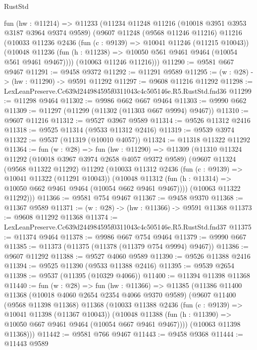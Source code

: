 \begin{lexlean}{RustStd}
\begin{coremodule}
  fun (hw : @11214) =>
  @11233
    (@11234
      @11248
      @11216
      (@10018 @3951 @3953 @3187 @3964 @9374 @9589)
      (@9607
        @11248
        (@9568 @11246 @11216)
        @11216
        (@10033
          @11236
          @2436
          (fun (c : @9139) => @10041 @11246 (@11215 @10043))
          (@10048 @11236 (fun (h : @11238) => @10050 @561 @9461 @9464 (@10054 @561 @9461 @9467))))
        (@10063 @11246 @11216)))
@11290 := @9581 @667 @9467
@11291 := @9458 @9372
@11292 := @11291 @9589
@11295 := (w : @28) -> (hw : @11290) -> @9591 @11292
@11297 := @9608 @11216 @11292
@11298 := LexLeanPreserve.Cc639d244984595f0311043c4c505146e.R5.RustStd.fnd36
@11299 := @11298 @9464
@11302 := @9986 @662 @667 @9464
@11303 := @9990 @662
@11309 := @11297 (@11299 (@11302 (@11303 @667 @9994) @9467))
@11310 := @9607 @11216
@11312 := @9527 @3967 @9589
@11314 := @9526 @11312 @2416
@11318 := @9525 @11314 (@9533 @11312 @2416)
@11319 := @9539 @3974
@11322 := @9537 (@11319 (@10010 @4057))
@11324 := @11318 @11322 @11292
@11364 := fun (w : @28) =>
  fun (hw : @11290) =>
  @11309
    (@11310
      @11324
      @11292
      (@10018 @3967 @3974 @2658 @4057 @9372 @9589)
      (@9607
        @11324
        (@9568 @11322 @11292)
        @11292
        (@10033
          @11312
          @2436
          (fun (c : @9139) => @10041 @11322 (@11291 @10043))
          (@10048 @11312 (fun (h : @11314) => @10050 @662 @9461 @9464 (@10054 @662 @9461 @9467))))
        (@10063 @11322 @11292)))
@11366 := @9581 @754 @9467
@11367 := @9458 @9370
@11368 := @11367 @9589
@11371 := (w : @28) -> (hw : @11366) -> @9591 @11368
@11373 := @9608 @11292 @11368
@11374 := LexLeanPreserve.Cc639d244984595f0311043c4c505146e.R5.RustStd.fnd37
@11375 := @11374 @9464
@11378 := @9986 @667 @754 @9464
@11379 := @9990 @667
@11385 := @11373 (@11375 (@11378 (@11379 @754 @9994) @9467))
@11386 := @9607 @11292
@11388 := @9527 @4060 @9589
@11390 := @9526 @11388 @2416
@11394 := @9525 @11390 (@9533 @11388 @2416)
@11395 := @9539 @2654
@11398 := @9537 (@11395 (@10329 @4066))
@11400 := @11394 @11398 @11368
@11440 := fun (w : @28) =>
  fun (hw : @11366) =>
  @11385
    (@11386
      @11400
      @11368
      (@10018 @4060 @2654 @2354 @4066 @9370 @9589)
      (@9607
        @11400
        (@9568 @11398 @11368)
        @11368
        (@10033
          @11388
          @2436
          (fun (c : @9139) => @10041 @11398 (@11367 @10043))
          (@10048 @11388 (fun (h : @11390) => @10050 @667 @9461 @9464 (@10054 @667 @9461 @9467))))
        (@10063 @11398 @11368)))
@11442 := @9581 @766 @9467
@11443 := @9458 @9368
@11444 := @11443 @9589

\end{coremodule}
\end{lexlean}
